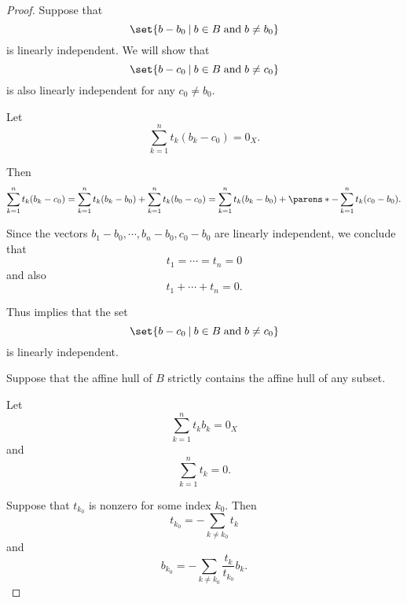 \begin{proof}
   Suppose that
  \begin{equation*}
    \set{ b - b_0 \given b \in B \T{and} b \neq b_0 }
  \end{equation*}
  is linearly independent. We will show that
  \begin{equation*}
    \set{ b - c_0 \given b \in B \T{and} b \neq c_0 }
  \end{equation*}
  is also linearly independent for any \( c_0 \neq b_0 \).

  Let
  \begin{equation*}
    \sum_{k=1}^n t_k (b_k - c_0) = 0_X.
  \end{equation*}

  Then
  \begin{equation*}
    \sum_{k=1}^n t_k (b_k - c_0)
    =
    \sum_{k=1}^n t_k (b_k - b_0) + \sum_{k=1}^n t_k (b_0 - c_0)
    =
    \sum_{k=1}^n t_k (b_k - b_0) + \parens*{ -\sum_{k=1}^n t_k } (c_0 - b_0).
  \end{equation*}

  Since the vectors \( b_1 - b_0, \cdots, b_n - b_0, c_0 - b_0 \) are linearly independent, we conclude that
  \begin{equation*}
    t_1 = \cdots = t_n = 0
  \end{equation*}
  and also
  \begin{equation*}
    t_1 + \cdots + t_n = 0.
  \end{equation*}

  Thus implies that the set
  \begin{equation*}
    \set{ b - c_0 \given b \in B \T{and} b \neq c_0 }
  \end{equation*}
  is linearly independent.

   Suppose that the affine hull of \( B \) strictly contains the affine hull of any subset.

  Let
  \begin{equation*}
    \sum_{k=1}^n t_k b_k = 0_X
  \end{equation*}
  and
  \begin{equation*}
    \sum_{k=1}^n t_k = 0.
  \end{equation*}

  Suppose that \( t_{k_0} \) is nonzero for some index \( k_0 \). Then
  \begin{equation*}
    t_{k_0} = - \sum_{k \neq k_0} t_k
  \end{equation*}
  and
  \begin{equation*}
    b_{k_0} = -\sum_{k \neq k_0} \frac {t_k} {t_{k_0}} b_k.
  \end{equation*}


\end{proof}
